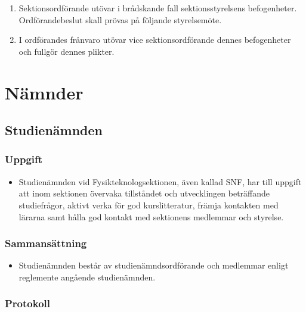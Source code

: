 \documentclass[11pt,a4paper]{article}
\begin{document}
\begin{enumerate}[\thesubsection .1]

  \item Sektionsordförande utövar i brådskande fall sektionsstyrelsens befogenheter. Ordförandebeslut skall prövas på följande styrelsemöte.

  \item I ordförandes frånvaro utövar vice sektionsordförande dennes
  befogenheter och fullgör dennes plikter.

\end{enumerate}

\newpage
\section{Nämnder}

\subsection{Studienämnden}

\subsubsection{Uppgift}

\begin{itemize}

  \item Studienämnden vid Fysikteknologsektionen, även kallad SNF, har till uppgift att
  inom sektionen övervaka tillståndet och utvecklingen beträffande
  studiefrågor, aktivt verka för god kurslitteratur, främja kontakten
  med lärarna samt hålla god kontakt med sektionens medlemmar och
  styrelse.

\end{itemize}

\subsubsection{Sammansättning}

\begin{itemize}

  \item Studienämnden består av studienämndsordförande och medlemmar
  enligt reglemente angående studienämnden.

\end{itemize}

\subsubsection{Protokoll}
\end{document}

